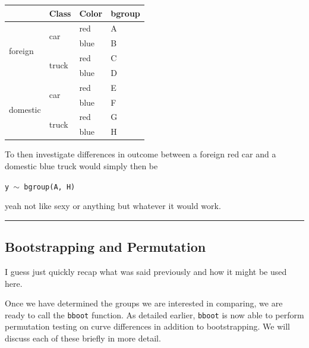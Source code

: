 \documentclass{article}
\newcommand{\xt}{\texttt}%
\begin{document}
\begin{center}

\begin{tabular}{|p{0.9in}|p{0.9in}|p{0.9in}|p{0.5in}|} \hline 
\rowcolor{lightgray} \multicolumn{1}{|c|}{Origin} & \multicolumn{1}{c|}{Class} & \multicolumn{1}{c|}{Color} & \multicolumn{1}{c|}{bgroup}\\
\hline
\multirow{4}{*}{foreign} & \multirow{2}{*}{car} & red & A\\
\hhline{~~--}
& & blue & B \\
\hhline{~---}
& \multirow{2}{*}{truck} & red & C\\
\hhline{~~--}
& & blue & D\\
\hline
\multirow{4}{*}{domestic} & \multirow{2}{*}{car} & red & E \\
\hhline{~~--}
& & blue & F\\
\hhline{~---}
& \multirow{2}{*}{truck} & red & G\\
\hhline{~~--}
& & blue & H\\
\hline
\end{tabular}
\end{center}

To then investigate differences in outcome between a foreign red car and a domestic blue truck would simply then be

\begin{center}
\tt y $\sim$ bgroup(A, H)
\end{center}

yeah not like sexy or anything but whatever it would work.

\noindent\rule{2cm}{0.4pt}

\subsection{Bootstrapping and Permutation}

I guess just quickly recap what was said previously and how it might be used here.

Once we have determined the groups we are interested in comparing, we are ready to call the \xt{bboot} function. As detailed earlier, \xt{bboot} is now able to perform permutation testing on curve differences in addition to bootstrapping. We will discuss each of these briefly in more detail.
\end{document}
